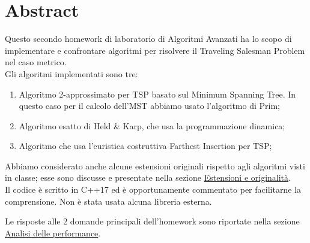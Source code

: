 \section{Abstract}
\label{cap:abstract}

Questo secondo homework di laboratorio di Algoritmi Avanzati ha lo scopo di implementare e confrontare algoritmi per risolvere il Traveling Salesman Problem nel caso metrico. \\

\noindent Gli algoritmi implementati sono tre:

\begin{enumerate}
    \item Algoritmo 2-approssimato per TSP basato sul Minimum Spanning Tree. In questo caso per il calcolo dell'MST abbiamo usato l'algoritmo di Prim;
    \item Algoritmo esatto di Held & Karp, che usa la programmazione dinamica;
    \item Algoritmo che usa l'euristica costruttiva Farthest Insertion per TSP;
\end{enumerate}

\noindent Abbiamo considerato anche alcune estensioni originali rispetto agli algoritmi visti in classe; esse sono discusse e presentate nella sezione \hyperref[cap:extensions-and-originalities]{Estensioni e originalità}. \\

\noindent Il codice è scritto in C++17 ed è opportunamente commentato per facilitarne la comprensione. Non è stata usata alcuna libreria esterna.

\noindent Le risposte alle 2 domande principali dell'homework sono riportate nella sezione \hyperref[cap:performance-analysis]{Analisi delle performance}.
